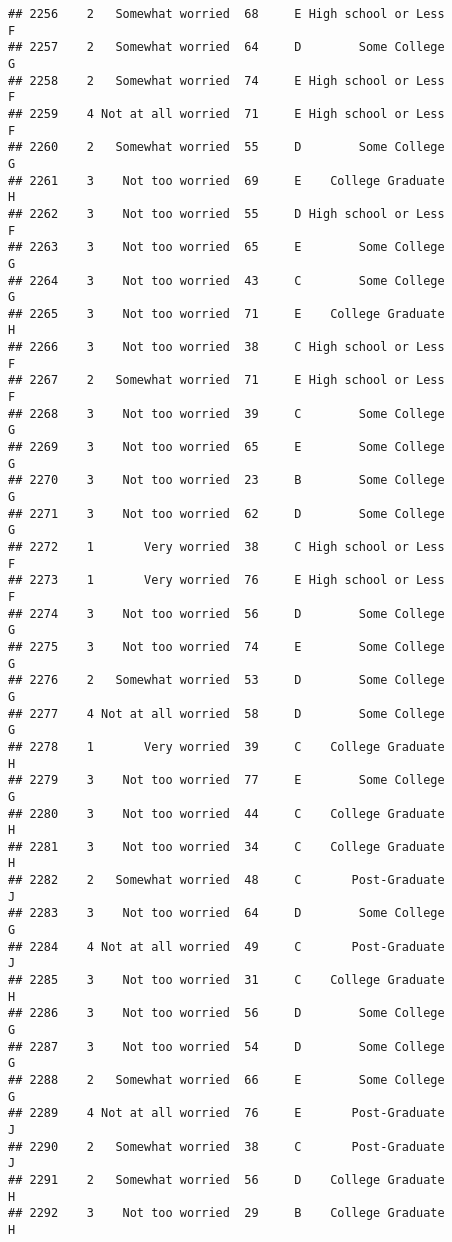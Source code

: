 \documentclass[
]{article}
\begin{document}
\begin{verbatim}
## 2256    2   Somewhat worried  68     E High school or Less         F
## 2257    2   Somewhat worried  64     D        Some College         G
## 2258    2   Somewhat worried  74     E High school or Less         F
## 2259    4 Not at all worried  71     E High school or Less         F
## 2260    2   Somewhat worried  55     D        Some College         G
## 2261    3    Not too worried  69     E    College Graduate         H
## 2262    3    Not too worried  55     D High school or Less         F
## 2263    3    Not too worried  65     E        Some College         G
## 2264    3    Not too worried  43     C        Some College         G
## 2265    3    Not too worried  71     E    College Graduate         H
## 2266    3    Not too worried  38     C High school or Less         F
## 2267    2   Somewhat worried  71     E High school or Less         F
## 2268    3    Not too worried  39     C        Some College         G
## 2269    3    Not too worried  65     E        Some College         G
## 2270    3    Not too worried  23     B        Some College         G
## 2271    3    Not too worried  62     D        Some College         G
## 2272    1       Very worried  38     C High school or Less         F
## 2273    1       Very worried  76     E High school or Less         F
## 2274    3    Not too worried  56     D        Some College         G
## 2275    3    Not too worried  74     E        Some College         G
## 2276    2   Somewhat worried  53     D        Some College         G
## 2277    4 Not at all worried  58     D        Some College         G
## 2278    1       Very worried  39     C    College Graduate         H
## 2279    3    Not too worried  77     E        Some College         G
## 2280    3    Not too worried  44     C    College Graduate         H
## 2281    3    Not too worried  34     C    College Graduate         H
## 2282    2   Somewhat worried  48     C       Post-Graduate         J
## 2283    3    Not too worried  64     D        Some College         G
## 2284    4 Not at all worried  49     C       Post-Graduate         J
## 2285    3    Not too worried  31     C    College Graduate         H
## 2286    3    Not too worried  56     D        Some College         G
## 2287    3    Not too worried  54     D        Some College         G
## 2288    2   Somewhat worried  66     E        Some College         G
## 2289    4 Not at all worried  76     E       Post-Graduate         J
## 2290    2   Somewhat worried  38     C       Post-Graduate         J
## 2291    2   Somewhat worried  56     D    College Graduate         H
## 2292    3    Not too worried  29     B    College Graduate         H

\end{verbatim}
\end{document}
